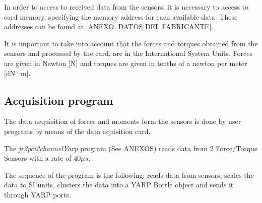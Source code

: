 In order to access to received data from the sensors, it is necessary to access to card memory, specifying the memory address for each available data. These addresses can be found at [ANEXO. DATOS DEL FABRICANTE].

It is important to take into account that the forces and torques obtained from the sensors and processed by the card, are in the International System Units. Forces are given in Newton [N] and torques are given in tenths of a newton per meter [dN·m].

\subsection{Acquisition program}
The data acquisition of forces and moments form the sensors is done by user programs by means of the data aquisition card. 

The \textit{jr3pci2channelYarp} program (See ANEXOS) reads data from 2 Force/Torque Sensors with a rate of $40 \mu s$.

The sequence of the program is the following: reads data from sensors, scales the data to SI units, clusters the data into a YARP Bottle object and sends it through YARP ports.
